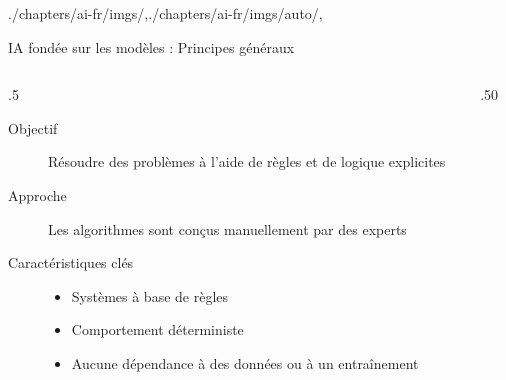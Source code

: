 \begin{graphicspathcontext}{{./chapters/ai-fr/imgs/},{./chapters/ai-fr/imgs/auto/},\old}

\begin{frame}[fragile,t]{{IA fondée sur les modèles :} Principes généraux}
	\small
	\vspace{-.15cm}
	\begin{columns}
		\begin{column}{.5\linewidth}
			\begin{block}{}
				\begin{description}
				\item[Objectif] Résoudre des problèmes à l'aide de règles et de logique explicites
				\item[Approche] Les algorithmes sont conçus manuellement par des experts
				\item[Caractéristiques clés]
					\begin{itemize}
					\item Systèmes à base de règles
					\item Comportement déterministe
					\item Aucune dépendance à des données ou à un entraînement
					\end{itemize}
				\end{description}
			\end{block}
		\end{column}
		\begin{column}{.50\linewidth}
			\vspace{-.5cm}
		\end{column}
	\end{columns}
	\normalsize
\end{frame}

\end{graphicspathcontext}

\endinput

